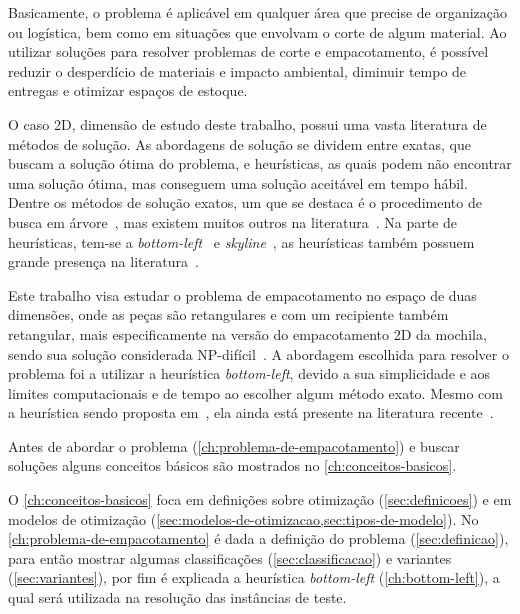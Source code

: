 Basicamente, o problema é aplicável em qualquer área que precise de organização ou logística,
bem como em situações que envolvam o corte de algum material.
Ao utilizar soluções para resolver problemas de corte e empacotamento, é possível reduzir o
desperdício de materiais e impacto ambiental, diminuir tempo de entregas e otimizar espaços
de estoque.

O caso 2D, dimensão de estudo deste trabalho, possui uma vasta literatura de métodos de solução.
As abordagens de solução se dividem entre exatas, que buscam a solução ótima do problema, e
heurísticas, as quais podem não encontrar uma solução ótima, mas conseguem uma solução aceitável em
tempo hábil.
Dentre os métodos de solução exatos, um que se destaca é o procedimento de busca em árvore~\cite{
    beasley1985exact}, mas existem muitos outros na literatura~\cite{exact-solution-techniques,
    fekete1997new,delorme2016bin,kenmochi2009exact}.
Na parte de heurísticas, tem-se a \textit{bottom-left}~\cite{baker1980orthogonal,chehrazad2022fast}
e \textit{skyline}~\cite{wei2011skyline}, as heurísticas também possuem grande presença na
literatura~\cite{burke2004new,rakotonirainy2020improved,hopper2001empirical,chen2019efficient,
    huang2007efficient,hopper2001review}.

Este trabalho visa estudar o problema de empacotamento no espaço de duas dimensões, onde as peças
são retangulares e com um recipiente também retangular, mais especificamente na versão do
empacotamento 2D da mochila, sendo sua solução considerada NP-difícil~\cite{2DPackLib}.
A abordagem escolhida para resolver o problema foi a utilizar a heurística \textit{bottom-left},
devido a sua simplicidade e aos limites computacionais e de tempo ao escolher algum método exato.
Mesmo com a heurística sendo proposta em~\citeyear*{baker1980orthogonal}, ela ainda está presente
na literatura recente~\cite{chehrazad2022fast,hopper2001empirical,wei2011skyline}.

Antes de abordar o problema (\autoref{ch:problema-de-empacotamento}) e buscar soluções alguns
conceitos básicos são mostrados no \autoref{ch:conceitos-basicos}.

O \autoref{ch:conceitos-basicos} foca em definições sobre otimização (\autoref{sec:definicoes})
e em modelos de otimização (\cref{sec:modelos-de-otimizacao,sec:tipos-de-modelo}).
No \autoref{ch:problema-de-empacotamento} é dada a definição do problema (\autoref{sec:definicao}),
para então mostrar algumas classificações (\autoref{sec:classificacao}) e variantes
(\autoref{sec:variantes}), por fim é explicada a heurística \textit{bottom-left}
(\autoref{ch:bottom-left}), a qual será utilizada na resolução das instâncias de teste.



